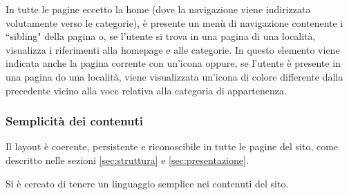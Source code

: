In tutte le pagine eccetto la home (dove la navigazione viene indirizzata
volutamente verso le categorie), è presente un menù di navigazione contenente
i ``sibling" della pagina o, se l'utente si trova in una pagina di una
località, visualizza i riferimenti alla homepage e alle categorie.
In questo elemento viene indicata anche la pagina corrente con un'icona
oppure, se l'utente è presente in una pagina do una località, viene
visualizzata un'icona di colore differente dalla precedente vicino alla
voce relativa alla categoria di appartenenza.

\subsubsection{Semplicità dei contenuti}
Il layout è coerente, persistente e riconoscibile in tutte le pagine del sito,
come descritto nelle sezioni \ref{sec:struttura} e \ref{sec:presentazione}.

Si è cercato di tenere un linguaggio semplice nei contenuti del sito.
